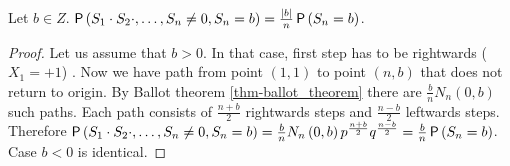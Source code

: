 \begin{thm}\label{thm-XXXX}
 Let $b \in Z$. $\operatorname{\textsf{P}} \left( S_1\cdot S_2 \cdot, \ldots, S_n\neq 0, S_n=b \right) =\frac{\left|{b}\right|}{n}\operatorname{\textsf{P}} \left( S_n=b \right) $.
\end{thm}
\begin{proof}
 Let us \Wlog assume that $b>0$. In that case, first step has to be rightwards ($X_1=+1$) . Now we have path from point $ \left( 1,1 \right) $ to point $ \left( n,b \right) $ that does not return to origin. By Ballot theorem \ref{thm-ballot_theorem} there are $\frac{b}{n}N_n \left( 0,b \right) $ such paths. Each path consists of $\frac{n+b}{2}$ rightwards steps and $\frac{n-b}{2}$ leftwards steps. Therefore $\operatorname{\textsf{P}} \left( S_1\cdot S_2 \cdot, \ldots, S_n\neq 0, S_n=b \right) =\frac{b}{n}N_n \left( 0,b \right) p^{\frac{n+b}{2}}q^{\frac{n-b}{2}}=\frac{b}{n}\operatorname{\textsf{P}} \left( S_n=b \right) $. Case $b<0$ is identical.
\end{proof}

